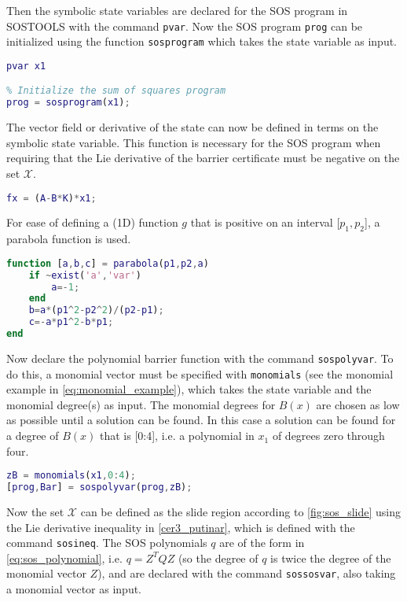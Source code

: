 Then the symbolic state variables are declared for the SOS program in SOSTOOLS with the command \texttt{pvar}. %
Now the SOS program \texttt{prog} can be initialized using the function \texttt{sosprogram} which takes the state variable as input. 
\begin{lstlisting}[language=matlab]
% Declare state variables
pvar x1

% Initialize the sum of squares program
prog = sosprogram(x1);
\end{lstlisting}
The vector field or derivative of the state can now be defined in terms on the symbolic state variable. This function is necessary for the SOS program when requiring that the Lie derivative of the barrier certificate must be negative on the set $\mathcal{X}$.
\begin{lstlisting}[language=matlab]
% Vector field dx/dt = fx (closed loop)
fx = (A-B*K)*x1;
\end{lstlisting}
For ease of defining a (1D) function $g$ that is positive on an interval [$p_1, p_2$], a parabola function is used.
\begin{lstlisting}[language=matlab]
function [a,b,c] = parabola(p1,p2,a)
	if ~exist('a','var')
		a=-1;
	end
	b=a*(p1^2-p2^2)/(p2-p1);
	c=-a*p1^2-b*p1;
end
\end{lstlisting}
Now declare the polynomial barrier function with the command \texttt{sospolyvar}. To do this, a monomial vector must be specified with \texttt{monomials} (see the monomial example in \autoref{eq:monomial_example}), which takes the state variable and the monomial degree(s) as input. The monomial degrees for $B(x)$ are chosen as low as possible until a solution can be found. In this case a solution can be found for a degree of $B(x)$ that is [0:4], i.e. a polynomial in $x_1$ of degrees zero through four.
\begin{lstlisting}[language=matlab]
% Declare the polynomial barrier function
zB = monomials(x1,0:4);
[prog,Bar] = sospolyvar(prog,zB);
\end{lstlisting}
Now the set $\mathcal{X}$ can be defined as the slide region according to \autoref{fig:sos_slide} using the Lie derivative inequality in \autoref{cer3_putinar}, which is defined with the command \texttt{sosineq}. The SOS polynomials $q$ are of the form in \autoref{eq:sos_polynomial}, i.e. $q=Z^TQZ$ (so the degree of $q$ is twice the degree of the monomial vector $Z$), and are declared with the command \texttt{sossosvar}, also taking a monomial vector as input.
